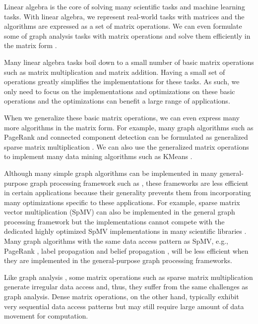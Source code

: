 Linear algebra is the core of solving many scientific tasks and machine learning
tasks. With linear algebra, we represent real-world tasks with matrices
and the algorithms are expressed as a set of matrix operations. We can even
formulate some of graph analysis tasks with matrix operations and solve them
efficiently in the matrix form \cite{linear_algebra}.

Many linear algebra tasks boil down to a small number of basic matrix operations
such as matrix multiplication and matrix addition. Having a small
set of operations greatly simplifies the implementations for these tasks.
As such, we only need to focus on the implementations and optimizations
on these basic operations and the optimizations can benefit a large range of
applications.

When we generalize these basic matrix operations, we can even express many more
algorithms in the matrix form. For example, many graph algorithms such as
PageRank \cite{pagerank} and connected component detection can be formulated
as generalized sparse matrix multiplication \cite{Mattson13, pegasus}. We can
also use the generalized matrix operations to implement many data mining
algorithms such as KMeans \cite{kmeans}.

Although many simple graph algorithms can be implemented in many general-purpose
graph processing framework such as \cite{PowerGraph, FlashGraph}, these frameworks
are less efficient in certain applications because their generality prevents
them from incorporating many optimizations specific to these applications.
For example, sparse matrix vector multiplication (SpMV) can also be implemented in
the general graph processing framework but the implementations cannot compete
with the dedicated highly optimized SpMV implementations in many scientific
libraries \cite{trilinos, petsc}. Many graph algorithms with the same data access
pattern as SpMV, e.g., PageRank \cite{pagerank}, label propagation \cite{label_prop}
and belief propagation \cite{Yedidia03}, will be less efficient when they are
implemented in the general-purpose graph processing frameworks.

Like graph analysis \cite{FlashGraph}, some matrix operations
such as sparse matrix multiplication generate irregular data access and, thus,
they suffer from the same challenges as graph analysis. Dense matrix operations,
on the other hand, typically exhibit very sequential data access patterns but
may still require large amount of data movement for computation.

